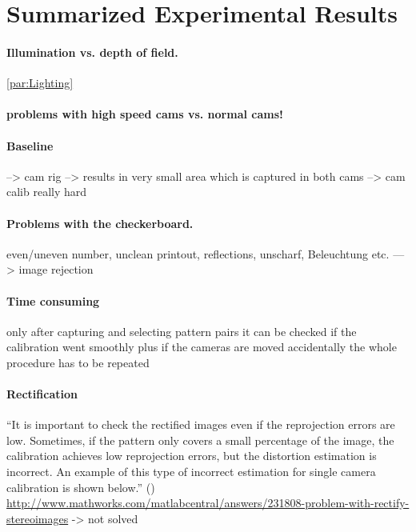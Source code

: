 \section{Summarized Experimental Results}\label{sec:ExperimentalResults}

\paragraph{Illumination vs. depth of field.}
\autoref{par:Lighting}

\paragraph{problems with high speed cams vs. normal cams!}

\paragraph{Baseline}
--> cam rig
--> results in very small area which is captured in both cams --> cam calib really hard

\paragraph{Problems with the checkerboard.}
even/uneven number, unclean printout, reflections, unscharf, Beleuchtung etc. ---> image rejection

\paragraph{Time consuming}
only after capturing and selecting pattern pairs it can be checked if the calibration went smoothly
plus if the cameras are moved accidentally the whole procedure has to be repeated

\paragraph{Rectification}

\enquote{It is important to check the rectified images even if the reprojection errors are low. Sometimes, if the pattern only covers a small percentage of the image, the calibration achieves low reprojection errors, but the distortion estimation is incorrect. An example of this type of incorrect estimation for single camera calibration is shown below.} (\cite{StereoCalib.2016})
\url{http://www.mathworks.com/matlabcentral/answers/231808-problem-with-rectify-stereoimages}
-> not solved

